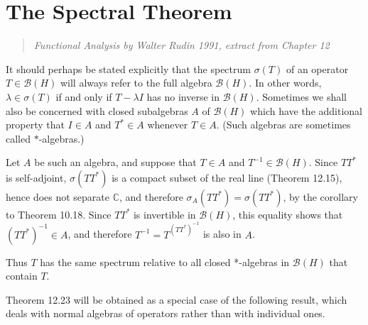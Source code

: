 \chapter{The Spectral Theorem}


\begin{quotation}
  \emph{Functional Analysis by Walter Rudin 1991, extract from Chapter 12}
\end{quotation}

It should perhaps be stated explicitly that the spectrum $\sigma(T)$ of an operator $T \in \mathcal{B}(H)$ will always refer to the full algebra $\mathcal{B}(H)$.
In other words, $\lambda \in \sigma(T)$ if and only if $T - \lambda I$ has no inverse in $\mathcal{B}(H)$.
Sometimes we shall also be concerned with closed subalgebras $A$ of $\mathcal{B}(H)$ which have the additional property that $I \in A$ and $T^* \in A$ whenever $T \in A$. (Such algebras are sometimes called $*$-algebras.)

Let $A$ be such an algebra, and suppose that $T \in A$ and $T^{-1} \in \mathcal{B}(H)$.
Since $TT^*$ is self-adjoint, $\sigma(TT^*)$ is a compact subset of the real line (Theorem 12.15), hence does not separate $\mathbb{C}$, and therefore $\sigma_A(TT^*) = \sigma(TT^*)$, by the corollary to Theorem 10.18.
Since $TT^*$ is invertible in $\mathcal{B}(H)$, this equality shows that $(TT^*)^{-1} \in A$, and therefore $T^{-1} = T^(TT^*)^{-1}$ is also in $A$.

Thus $T$ has the same spectrum relative to all closed *-algebras in $\mathcal{B}(H)$ that contain $T$.

Theorem 12.23 will be obtained as a special case of the following result, which deals with normal algebras of operators rather than with individual ones.

